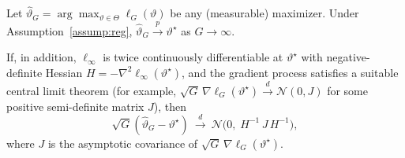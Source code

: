 \begin{theorem}
\label{thm:consistency}
Let \(\widehat\vartheta_G=\arg\max_{\vartheta\in\Theta}\ell_G(\vartheta)\) be any (measurable) maximizer.
Under Assumption~\ref{assump:reg}, \(\widehat\vartheta_G \xrightarrow{p} \vartheta^\star\) as \(G\to\infty\).

If, in addition, \(\ell_\infty\) is twice continuously differentiable at \(\vartheta^\star\) with negative-definite Hessian \(H=-\nabla^2\ell_\infty(\vartheta^\star)\), and
the gradient process satisfies a suitable central limit theorem (for example,
\(\sqrt{G}\,\nabla \ell_G(\vartheta^\star)\xrightarrow{d}\mathcal N(0,J)\) for some positive semi-definite matrix \(J\)),
then
\[
\sqrt{G}(\widehat\vartheta_G-\vartheta^\star)\ \xrightarrow{d}\ \mathcal N\!\big(0,\; H^{-1}\,J\,H^{-1}\big),
\]
where \(J\) is the asymptotic covariance of \(\sqrt{G}\,\nabla \ell_G(\vartheta^\star)\).
\end{theorem}
